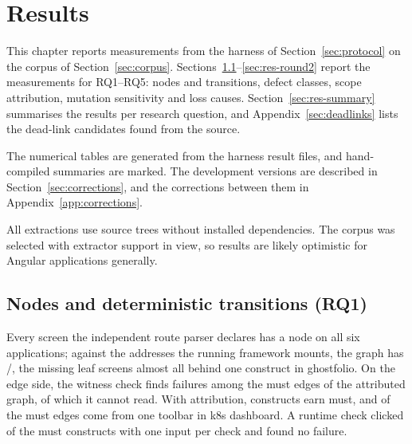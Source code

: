 \section{Results}
\label{ch:results}

This chapter reports measurements from the harness of Section~\ref{sec:protocol} on the corpus of
Section~\ref{sec:corpus}. Sections~\ref{sec:res-baseline}--\ref{sec:res-round2} report the
measurements for RQ1--RQ5: nodes and transitions, defect classes, scope attribution, mutation sensitivity and loss
causes. Section~\ref{sec:res-summary} summarises the results per research question, and
Appendix~\ref{sec:deadlinks} lists the dead-link candidates found from the source.

The numerical tables are generated from the harness result files, and hand-compiled summaries are marked. The development versions are described in Section~\ref{sec:corrections}, and the corrections between them in Appendix~\ref{app:corrections}.

All extractions use source trees without installed dependencies. The corpus was selected with extractor
support in view, so results are likely optimistic for Angular applications generally.

\subsection{Nodes and deterministic transitions (RQ1)}
\label{sec:res-baseline}

Every screen the independent route parser declares has a node on all six applications; against the
addresses the running framework mounts, the graph has \ProbeNodes{}/\ProbeScreens{}, the missing leaf
screens almost all behind one construct in ghostfolio. On the edge side, the witness check finds
\MustWitnessViolations{} failures among the \MustWitnessEdges{} must edges of the attributed graph,
\MustWitnessUnread{} of which it cannot read. With attribution, \CensusMustSites{} constructs earn must, and \CensusMustKdash{} of the \CensusMust{} must edges come from one
toolbar in k8s dashboard. A runtime check clicked \MustRunConfirmedConstructs{} of the
\CensusMustSites{} must constructs with one input per check and found no failure.

